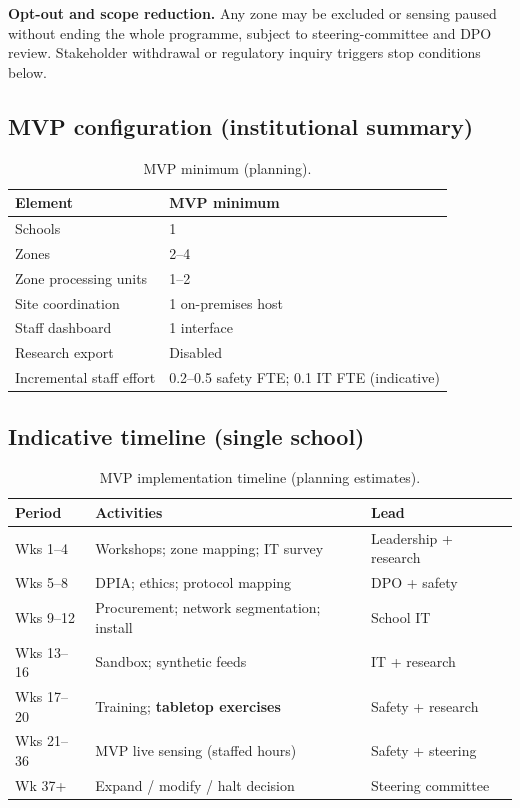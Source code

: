 \textbf{Opt-out and scope reduction.} Any zone may be excluded or sensing paused without ending the
whole programme, subject to steering-committee and DPO review.
Stakeholder withdrawal or regulatory inquiry triggers stop conditions below.

\subsection{MVP configuration (institutional summary)}

\begin{table}[htbp]
  \centering
  \caption{MVP minimum (planning).}
  \label{tab:mvp-config}
  \small
  \begin{tabular}{@{}ll@{}}
    \toprule
    Element & MVP minimum \\
    \midrule
    Schools & 1 \\
    Zones & 2--4 \\
    Zone processing units & 1--2 \\
    Site coordination & 1 on-premises host \\
    Staff dashboard & 1 interface \\
    Research export & Disabled \\
    Incremental staff effort & 0.2--0.5 safety FTE; 0.1 IT FTE (indicative) \\
    \bottomrule
  \end{tabular}
\end{table}

\subsection{Indicative timeline (single school)}

\begin{table}[htbp]
  \centering
  \caption{MVP implementation timeline (planning estimates).}
  \label{tab:timeline}
  \small
  \begin{tabular}{@{}p{2.2cm}p{5.4cm}p{3.4cm}@{}}
    \toprule
    Period & Activities & Lead \\
    \midrule
    Wks 1--4 & Workshops; zone mapping; IT survey & Leadership + research \\
    Wks 5--8 & DPIA; ethics; protocol mapping & DPO + safety \\
    Wks 9--12 & Procurement; network segmentation; install & School IT \\
    Wks 13--16 & Sandbox; synthetic feeds & IT + research \\
    Wks 17--20 & Training; \textbf{tabletop exercises} & Safety + research \\
    Wks 21--36 & MVP live sensing (staffed hours) & Safety + steering \\
    Wk 37+ & Expand / modify / halt decision & Steering committee \\
    \bottomrule
  \end{tabular}
\end{table}

